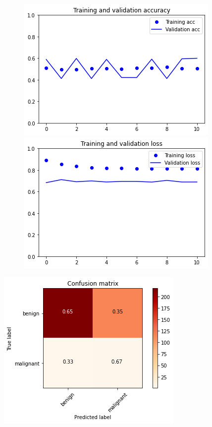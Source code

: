 \documentclass{article}
\begin{document}
\begin{figure}[h]
    \centering
    \begin{minipage}{0.45\textwidth}
        \centering
        \includegraphics[scale=0.46]{./img/preTrainValResNet_ft_3_2.png}
    \end{minipage}\hfill
    \begin{minipage}{0.45\textwidth}
        \centering
        \includegraphics[scale=0.46]{./img/preTrainLossResNet_ft_3_2.png}
    \end{minipage}
\end{figure}

\begin{center}
\begin{minipage}{0.45\textwidth}
        \includegraphics[scale=2.6]{./img/cmPreTrainResNet_ft_3_2.png}
    \end{minipage}
\end{center}
\end{document}
